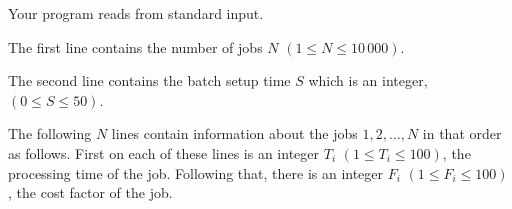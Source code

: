 Your program reads from standard input. 

The first line contains the number of jobs $N$ $(1 \le N \le 10\,000)$.

The second line contains the batch setup time $S$ which is an integer, $(0 \le S \le 50)$.

The following $N$ lines contain information about the jobs $1, 2, \ldots, N$ in that order as follows.
First on each of these lines is an integer $T_i$ $(1 \le T_i \le 100)$, the processing time of the job.
Following that, there is an integer $F_i$ $(1 \le F_i \le 100)$, the cost factor of the job.